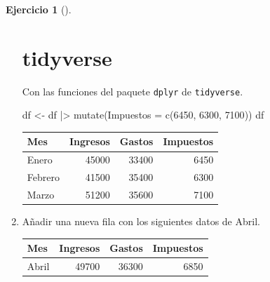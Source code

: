 \documentclass[
  spanish,
  a4paper,
]{scrreport}
\newenvironment{Shaded}{\begin{snugshade}}{\end{snugshade}}
\newcommand{\AttributeTok}[1]{\textcolor[rgb]{0.40,0.45,0.13}{#1}}
\newcommand{\DecValTok}[1]{\textcolor[rgb]{0.68,0.00,0.00}{#1}}
\newcommand{\FunctionTok}[1]{\textcolor[rgb]{0.28,0.35,0.67}{#1}}
\newcommand{\NormalTok}[1]{\textcolor[rgb]{0.00,0.23,0.31}{#1}}
\newcommand{\OtherTok}[1]{\textcolor[rgb]{0.00,0.23,0.31}{#1}}
\newcommand{\SpecialCharTok}[1]{\textcolor[rgb]{0.37,0.37,0.37}{#1}}
\theoremstyle{definition}
\newtheorem{exercise}{Ejercicio}[chapter]
\theoremstyle{remark}
\begin{document}
\begin{exercise}[]
\begin{enumerate}
\begin{tcolorbox}
  \section{tidyverse}

  Con las funciones del paquete \texttt{dplyr} de \texttt{tidyverse}.

\begin{Shaded}
\begin{Highlighting}[]
\NormalTok{df }\OtherTok{\textless{}{-}}\NormalTok{ df }\SpecialCharTok{|\textgreater{}} \FunctionTok{mutate}\NormalTok{(}\AttributeTok{Impuestos =} \FunctionTok{c}\NormalTok{(}\DecValTok{6450}\NormalTok{, }\DecValTok{6300}\NormalTok{, }\DecValTok{7100}\NormalTok{))}
\NormalTok{df}
\end{Highlighting}
\end{Shaded}

  \begin{longtable}[]{@{}lrrr@{}}
  \toprule\noalign{}
  Mes & Ingresos & Gastos & Impuestos \\
  \midrule\noalign{}
  \endhead
  \bottomrule\noalign{}
  \endlastfoot
  Enero & 45000 & 33400 & 6450 \\
  Febrero & 41500 & 35400 & 6300 \\
  Marzo & 51200 & 35600 & 7100 \\
  \end{longtable}

  \end{tcolorbox}
\item
  Añadir una nueva fila con los siguientes datos de Abril.

  \begin{longtable}[]{@{}lrrr@{}}
  \toprule\noalign{}
  Mes & Ingresos & Gastos & Impuestos \\
  \midrule\noalign{}
  \endhead
  \bottomrule\noalign{}
  \endlastfoot
  Abril & 49700 & 36300 & 6850 \\
  \end{longtable}

  \begin{tcolorbox}[enhanced jigsaw, titlerule=0mm, arc=.35mm, rightrule=.15mm, opacitybacktitle=0.6, leftrule=.75mm, colframe=quarto-callout-tip-color-frame, toptitle=1mm, breakable, colbacktitle=quarto-callout-tip-color!10!white, bottomrule=.15mm, colback=white, left=2mm, bottomtitle=1mm, opacityback=0, title=\textcolor{quarto-callout-tip-color}{\faLightbulb}\hspace{0.5em}{Solución}, toprule=.15mm, coltitle=black]


\end{tcolorbox}
\end{enumerate}
\end{exercise}
\end{document}
